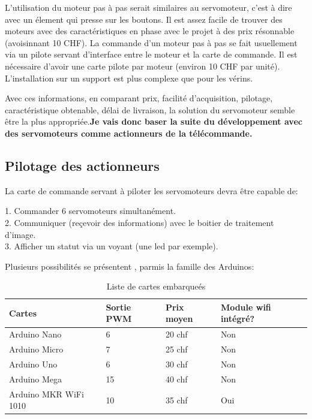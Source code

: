 L'utilisation du moteur pas à pas serait similaires au servomoteur, c'est à dire avec un élement qui presse sur les boutons.
Il est assez facile de trouver des moteurs avec des caractéristiques en phase avec le projet à des prix résonnable (avoisinnant 10 CHF). La commande d'un moteur pas à pas
se fait usuellement via un pilote servant d'interface entre le moteur et la carte de commande. Il est nécessaire d'avoir une carte pilote par moteur (environ 10 CHF par unité).
L'installation sur un support est plus complexe que pour les vérins.

Avec ces informations, en comparant prix, facilité d'acquisition, pilotage, caractéristique obtenable, délai de livraison, la solution du servomoteur semble être la plus
appropriée.\textbf{Je vais donc baser la suite du développement avec des servomoteurs comme actionneurs de la télécommande.}

\subsection{Pilotage des actionneurs}
La carte de commande servant à piloter les servomoteurs devra être capable de:
\begin{listage}
    1. Commander 6 servomoteurs simultanément.\\
    2. Communiquer (reçevoir des informations) avec le boitier de traitement d'image.\\
    3. Afficher un statut via un voyant (une led par exemple).
\end{listage}

Plusieurs possibilités se présentent , parmis la famille des Arduinos:
\begin{table}[H]
    \begin{center}
        \caption{Liste de cartes embarqueés}
        \begin{tabular}{|l|l|l|l|}
            Cartes                & Sortie PWM & Prix moyen   & Module \Gls{wifi} intégré? \\ \hline
            Arduino Nano          & 6          & 20 \Gls{chf} & Non                        \\
            Arduino Micro         & 7          & 25 \Gls{chf} & Non                        \\
            Arduino Uno           & 6          & 30 \Gls{chf} & Non                        \\
            Arduino Mega          & 15         & 40 \Gls{chf} & Non                        \\
            Arduino MKR WiFi 1010 & 10         & 35 \Gls{chf} & Oui
        \end{tabular}
    \end{center}
\end{table}\\

